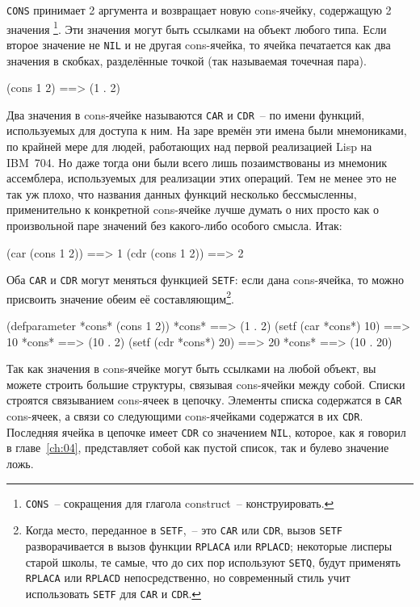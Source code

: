 \lstinline{CONS} принимает 2 аргумента и возвращает новую cons-ячейку, содержащую 2 значения
\footnote{\lstinline{CONS}~-- сокращения для глагола construct~-- конструировать.}\hspace{\footnotenegspace}. Эти значения
могут быть ссылками на объект любого типа. Если второе значение не \lstinline{NIL} и не другая
cons-ячейка, то ячейка печатается как два значения в скобках, разделённые точкой (так
называемая точечная пара).

\begin{myverb}
(cons 1 2) ==> (1 . 2)
\end{myverb}

Два значения в cons-ячейке называются \lstinline{CAR} и \lstinline{CDR}~-- по имени функций,
используемых для доступа к ним. На заре времён эти имена были мнемониками, по крайней мере
для людей, работающих над первой реализацией Lisp на IBM~704. Но даже тогда они были всего
лишь позаимствованы из мнемоник ассемблера, используемых для реализации этих операций. Тем
не менее это не так уж плохо, что названия данных функций несколько бессмысленны,
применительно к конкретной cons-ячейке лучше думать о них просто как о произвольной паре
значений без какого-либо особого смысла. Итак:

\begin{myverb}
(car (cons 1 2)) ==> 1
(cdr (cons 1 2)) ==> 2
\end{myverb}

Оба \lstinline{CAR} и \lstinline{CDR} могут меняться функцией \lstinline{SETF}: если дана cons-ячейка, то
можно присвоить значение обеим её составляющим\footnote{Когда место, переданное в
  \lstinline{SETF},~-- это \lstinline{CAR} или \lstinline{CDR}, вызов \lstinline{SETF} разворачивается в вызов
  функции \lstinline{RPLACA} или \lstinline{RPLACD}; некоторые лисперы старой школы, те самые, что
  до сих пор используют \lstinline{SETQ}, будут применять \lstinline{RPLACA} или \lstinline{RPLACD}
  непосредственно, но современный стиль учит использовать \lstinline{SETF} для \lstinline{CAR} и
  \lstinline{CDR}.}\hspace{\footnotenegspace}.

\begin{myverb}
(defparameter *cons* (cons 1 2))
*cons*                 ==> (1 . 2)
(setf (car *cons*) 10) ==> 10
*cons*                 ==> (10 . 2)
(setf (cdr *cons*) 20) ==> 20
*cons*                 ==> (10 . 20)
\end{myverb}

Так как значения в cons-ячейке могут быть ссылками на любой объект, вы можете строить большие
структуры, связывая cons-ячейки между собой. Списки строятся связыванием cons-ячеек в
цепочку. Элементы списка содержатся в \lstinline{CAR} cons-ячеек, а связи со следующими
cons-ячейками содержатся в их \lstinline{CDR}. Последняя ячейка в цепочке имеет \lstinline{CDR} со
значением \lstinline{NIL}, которое, как я говорил в главе~\ref{ch:04}, представляет собой как
пустой список, так и булево значение ложь.

